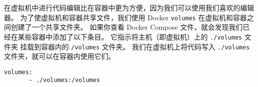 在虚拟机中进行代码编辑比在容器中更为方便，因为我们可以使用我们喜欢的编辑器。
为了使虚拟机和容器共享文件，我们使用 Docker \texttt{volumes}
在虚拟机和容器之间创建了一个共享文件夹。
如果你查看 Docker Compose 文件，就会发现我们已经在某些容器中添加了以下条目。
它指示将主机（即虚拟机）上的 \texttt{./volumes} 文件夹
挂载到容器内的 \texttt{/volumes} 文件夹。
我们在虚拟机上将代码写入 \texttt{./volumes} 文件夹，就可以在容器内使用它们。

\begin{lstlisting}
volumes:
       - ./volumes:/volumes
\end{lstlisting}

